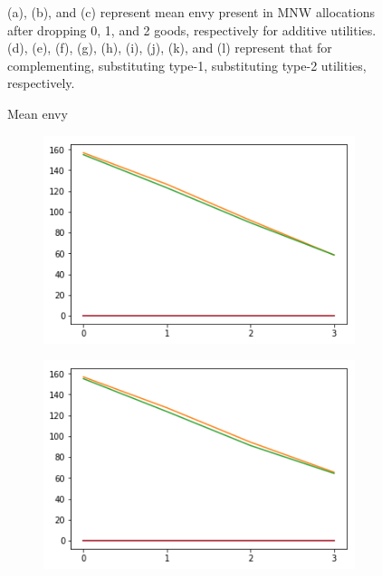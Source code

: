 \begin{figure}[h!]
\begin{subfigure}[b]{0.3\linewidth}
    \caption{}
  \end{subfigure}
  \caption{Mean envy}
  \label{fig:efk}
  \small
    (a), (b), and (c) represent mean envy present in MNW allocations after dropping 0, 1, and 2 goods, respectively for additive utilities. (d), (e), (f), (g), (h), (i), (j), (k), and (l) represent that for complementing, substituting type-1, substituting type-2 utilities, respectively.
\end{figure}

\begin{figure}[h!]
  \centering
  \begin{subfigure}[b]{0.3\linewidth}
    \includegraphics[width=\linewidth]{images/add/ef0_means_pos.png}
    \caption{}
  \end{subfigure}
  \begin{subfigure}[b]{0.3\linewidth}
    \includegraphics[width=\linewidth]{images/add/ef1_means_pos.png}

\end{subfigure}
\end{figure}
